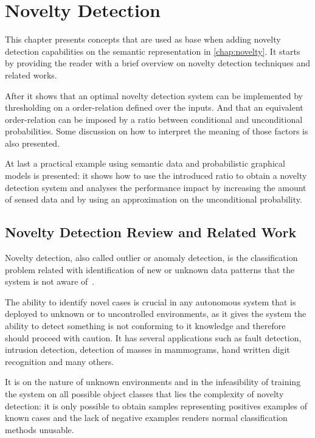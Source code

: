 \chapter{Novelty Detection}\label{chap:novelty-intro}

This chapter presents concepts that are used as base when adding novelty
detection capabilities on the semantic representation in \autoref{chap:novelty}.
It starts by providing the reader with a brief overview on novelty detection
techniques and related works.

After it shows that an optimal novelty detection system can be implemented by
thresholding on a order-relation defined over the inputs.
And that an equivalent order-relation can be imposed by a ratio between
conditional and unconditional probabilities.
Some discussion on how to interpret the meaning of those factors is also
presented.

At last a practical example using semantic data and probabilistic graphical
models is presented: it shows how to use the introduced ratio to obtain a
novelty detection system and analyses the performance impact by increasing
the amount of sensed data and by using an approximation on the unconditional
probability.


\section{Novelty Detection Review and Related Work}
Novelty detection, also called outlier or anomaly detection, is the
classification problem related with identification of new or unknown data
patterns that the system is not aware of~\cite{markou2003novelty}.

The ability to identify novel cases is crucial in any autonomous system
that is deployed to unknown or to uncontrolled environments, as it gives the
system the ability to detect something is not conforming to it knowledge and
therefore should proceed with caution.
It has several applications such as fault detection, intrusion detection,
detection of masses in mammograms, hand written digit recognition and many
others.

It is on the nature of unknown environments and in the infeasibility of
training the system on all possible object classes that lies the complexity of
novelty detection: it is only possible to obtain samples representing positives
examples of known cases and the lack of negative examples renders normal
classification methods unusable.

